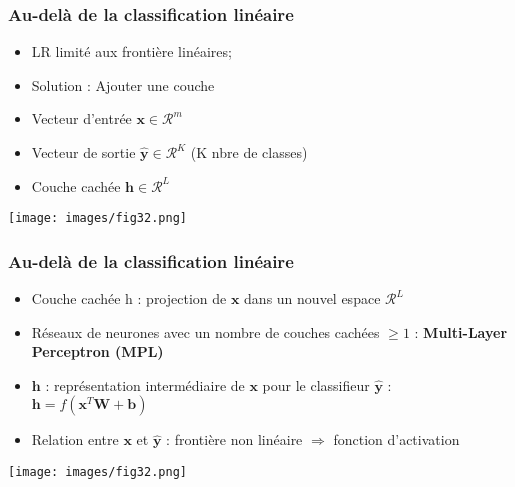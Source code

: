\documentclass[9pt]{beamer}
\newcommand \ve[1]{\mathbf{#1}}
\begin{document}
\begin{frame}
\frametitle{Au-delà de la classification linéaire}

\begin{minipage}[c]{0.4\linewidth}
\begin{itemize}
\item LR limité aux frontière linéaires;
\item Solution : Ajouter une couche
\end{itemize}
\end{minipage}
\begin{minipage}[c]{0.5\linewidth}
\begin{itemize}
\item Vecteur d'entrée $\ve{x} \in \mathcal{R}^m$
\item Vecteur de sortie $\ve{\hat{y}} \in \mathcal{R}^K$ (K nbre de classes)
\item Couche cachée $\ve{h} \in \mathcal{R}^L$
\end{itemize}
\end{minipage}
\begin{center}
\texttt{[image: images/fig32.png]}
\end{center}
\end{frame}

\begin{frame}
\frametitle{Au-delà de la classification linéaire}

\begin{minipage}[c]{0.4\linewidth}
\begin{itemize}
\item Couche cachée h : projection de $\ve{x}$ dans un nouvel espace $\mathcal{R}^L$
\item Réseaux de neurones avec un nombre de couches cachées $\geqslant 1$ : \textbf{Multi-Layer Perceptron (MPL)}
\end{itemize}
\end{minipage}
\begin{minipage}[c]{0.5\linewidth}
\begin{itemize}
\item $\ve{h}$ : représentation intermédiaire de $\ve{x}$ pour le classifieur $\ve{\hat{y}}$ : $\ve{h} = f(\ve{x}^T\ve{W}+\ve{b})$
\item Relation entre $\ve{x}$ et $\ve{\hat{y}}$ : frontière non linéaire $\Rightarrow$ fonction d'activation 
\end{itemize}
\end{minipage}
\begin{center}
\texttt{[image: images/fig32.png]}
\end{center}
\end{frame}
\end{document}
